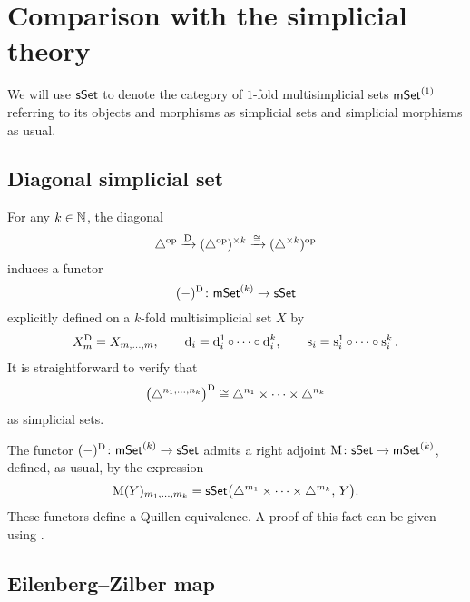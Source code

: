 
\section{Comparison with the simplicial theory} \label{s:comparison}

We will use $\mathsf{sSet}$ to denote the category of $1$-fold multisimplicial sets $\mathsf{mSet}^{(1)}$ referring to its objects and morphisms as simplicial sets and simplicial morphisms as usual.

\subsection{Diagonal simplicial set} \label{ss:diagonal}

For any $k \in \mathbb{N}$, the diagonal
\[
\triangle^{\mathrm{op}} \xrightarrow{\mathrm{D}}
(\triangle^{\mathrm{op}})^{\times k} \xrightarrow{\cong}
(\triangle^{\times k})^{\mathrm{op}}
\]
induces a functor
\[
(-)^{\mathrm{D}} \colon \mathsf{mSet}^{(k)} \to \mathsf{sSet}
\]
explicitly defined on a $k$-fold multisimplicial set $X$ by
\begin{gather*}
	X^{\mathrm{D}}_m = X_{m, \dots, m},
	\qquad
	\operatorname{d}_i = \operatorname{d}_i^1 \circ \dots \circ \operatorname{d}_i^k,
	\qquad
	\operatorname{s}_i = \operatorname{s}_i^1 \circ \dots \circ \operatorname{s}_i^k.
\end{gather*}
It is straightforward to verify that
\[
\big(\triangle^{n_1,\dots,n_k}\big)^{\mathrm{D}} \cong
\triangle^{n_1}\times\dots\times\triangle^{n_k}
\]
as simplicial sets.

The functor $(-)^{\mathrm{D}} \colon \mathsf{mSet}^{(k)} \to \mathsf{sSet}$ admits a right adjoint $\operatorname{M} \colon \mathsf{sSet} \to \mathsf{mSet}^{(k)}$, defined, as usual, by the expression
\[
\operatorname{M}(Y)_{m_1,\dots,m_k} =
\mathsf{sSet}\big( \triangle^{m_1} \times \dots \times \triangle^{m_k}, \, Y \big).
\]
These functors define a Quillen equivalence.
A proof of this fact can be given using \cite[Proposition~1.6.8]{maltsiniotis2005grothendieck}.

\subsection{Eilenberg--Zilber map} \label{ss:eilenber-zilber}

